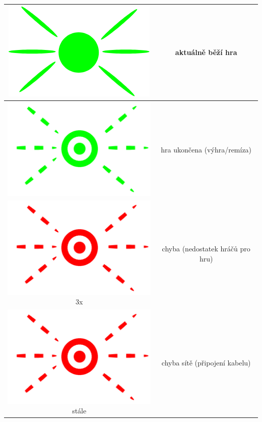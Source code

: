 \begin{table}[hbtp]
\begin{tabular}{|c|c|}
\includegraphics[height=\LEDsingHeight]{img/manual/green.png}             & aktuálně běží hra                \\ \hline
\includegraphics[height=\LEDsingHeight]{img/manual/green_blink.png}       & hra ukončena (výhra/remíza)      \\ \hline
\includegraphics[height=\LEDsingHeight]{img/manual/red_blink.png} 3x      & chyba (nedostatek hráčů pro hru) \\ \hline
\includegraphics[height=\LEDsingHeight]{img/manual/red_blink.png} stále   & chyba sítě (připojení kabelu)    \\ \hline
\end{tabular}
\end{table}
